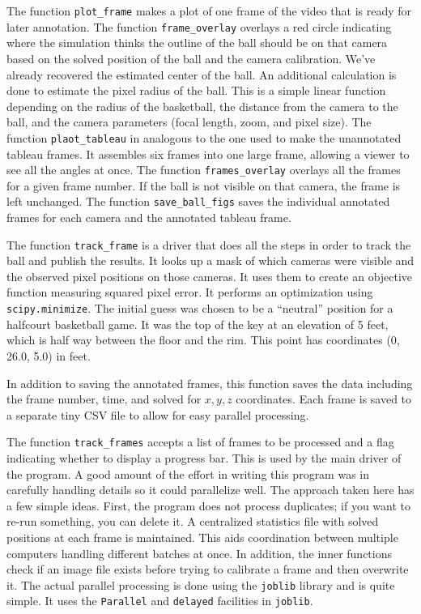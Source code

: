 \documentclass{article}
\begin{document}
The function \texttt{plot\_frame} makes a plot of one frame of the video
that is ready for later annotation.
The function \texttt{frame\_overlay} overlays a red circle 
indicating where the simulation thinks the outline of the ball should be
on that camera based on the solved position of the ball and the camera calibration.
We've already recovered the estimated center of the ball.  
An additional calculation is done to estimate the pixel radius of the ball.
This is a simple linear function depending on the radius of the basketball,
the distance from the camera to the ball, and the camera parameters 
(focal length, zoom, and pixel size).  
The function \texttt{plaot\_tableau} in analogous to the one used to make the 
unannotated tableau frames.  It assembles six frames into one large frame,
allowing a viewer to see all the angles at once.
The function \texttt{frames\_overlay} overlays all the frames for a given frame number.
If the ball is not visible on that camera, the frame is left unchanged.
The function \texttt{save\_ball\_figs} saves the individual annotated frames for
each camera and the annotated tableau frame.

The function \texttt{track\_frame} is a driver that does all the steps in order
to track the ball and publish the results.
It looks up a mask of which cameras were visible and 
the observed pixel positions on those cameras.  
It uses them to create an objective function measuring squared pixel error.
It performs an optimization using \texttt{scipy.minimize}.
The initial guess was chosen to be a ``neutral'' position for a halfcourt basketball game.
It was the top of the key at an elevation of 5 feet, which is half way between the floor and the rim.
This point has coordinates (0, 26.0, 5.0) in feet.

In addition to saving the annotated frames, this function saves the data including the 
frame number, time, and solved for $x, y, z$ coordinates.
Each frame is saved to a separate tiny CSV file to allow for easy parallel processing.

The function \texttt{track\_frames} accepts a list of frames to be processed and a flag
indicating whether to display a progress bar.  
This is used by the main driver of the program.  
A good amount of the effort in writing this program was in carefully handling details so 
it could parallelize well.  The approach taken here has a few simple ideas.
First, the program does not process duplicates; if you want to re-run something,
you can delete it.  
A centralized statistics file with solved positions at each frame is maintained.
This aids coordination between multiple computers handling different batches at once.
In addition, the inner functions check if an image file exists before trying to calibrate 
a frame and then overwrite it.  
The actual parallel processing is done using the \texttt{joblib} library and is quite simple.
It uses the \texttt{Parallel} and \texttt{delayed} facilities in \texttt{joblib}.
\end{document}
